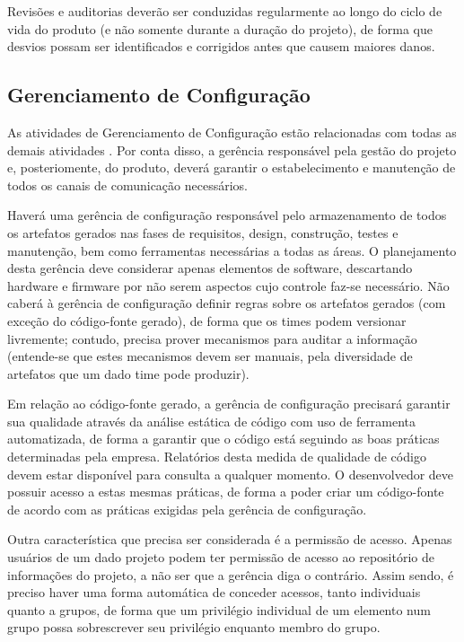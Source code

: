 \documentclass[12pt,journal,compsoc]{IEEEtran}
\begin{document}
Revisões e auditorias \cite{society_software_2004} deverão ser conduzidas
regularmente ao longo do ciclo de vida do produto (e não somente durante a
duração do projeto), de forma que desvios possam ser identificados e corrigidos
antes que causem maiores danos.

\subsection{Gerenciamento de Configuração}

As atividades de Gerenciamento de Configuração estão relacionadas com todas
as demais atividades \cite{society_software_2004}. Por conta disso, a gerência
responsável pela gestão do projeto e, posteriomente, do produto, deverá
garantir o estabelecimento e manutenção de todos os canais de comunicação
necessários.

Haverá uma gerência de configuração responsável pelo armazenamento de todos os
artefatos gerados nas fases de requisitos, design, construção, testes e
manutenção, bem como ferramentas necessárias a todas as áreas. O planejamento
desta gerência deve considerar apenas elementos de software, descartando
hardware e firmware por não serem aspectos cujo controle faz-se necessário. Não
caberá à gerência de configuração definir regras sobre os artefatos gerados
(com exceção do código-fonte gerado), de forma que os times podem versionar
livremente; contudo, precisa prover mecanismos para auditar a informação
(entende-se que estes mecanismos devem ser manuais, pela diversidade de
artefatos que um dado time pode produzir). 

Em relação ao código-fonte gerado, a gerência de configuração precisará garantir sua qualidade através da análise estática de código com uso de ferramenta automatizada, de forma a garantir que o código está seguindo as boas práticas determinadas pela empresa. Relatórios desta medida de qualidade de código devem estar disponível para consulta a qualquer momento. O desenvolvedor deve possuir acesso a estas mesmas práticas, de forma a poder criar um código-fonte de acordo com as práticas exigidas pela gerência de configuração. 

Outra característica que precisa ser considerada é a permissão de acesso. Apenas usuários de um dado projeto podem ter permissão de acesso ao repositório de informações do projeto, a não ser que a gerência diga o contrário. Assim sendo, é preciso haver uma forma automática de conceder acessos, tanto individuais quanto a grupos, de forma que um privilégio individual de um elemento num grupo possa sobrescrever seu privilégio enquanto membro do grupo.
\end{document}
